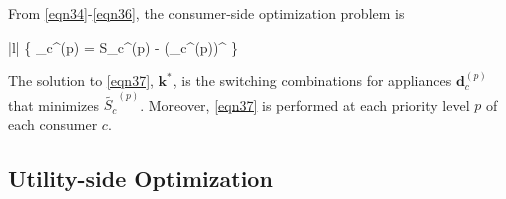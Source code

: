 \documentclass[conference, a4paper]{IEEEtran}
\begin{document}
From \eqref{eqn34}-\eqref{eqn36}, the consumer-side optimization problem is
\begin{mini!}|l|
	{}
	{ \left\{ _{c}^{\left(p\right)} = S_{c}^{\left(p\right)} - \left(_{c}^{\left(p\right)}\right)^{\intercal}  \right\} }
	{\label{eqn37}}
	{}{}
\end{mini!}
The solution to \eqref{eqn37}, $\mathbf{k}^{\ast}$, is the switching combinations for appliances $\mathbf{d}_{c}^{\left(p\right)}$ that minimizes $\tilde{S_{c}}^{\left(p\right)}$.
Moreover, \eqref{eqn37} is performed at each priority level $p$ of each consumer $c$.

\subsection{Utility-side Optimization}
\label{subsec: II--Utility-side Optimization}
\end{document}
